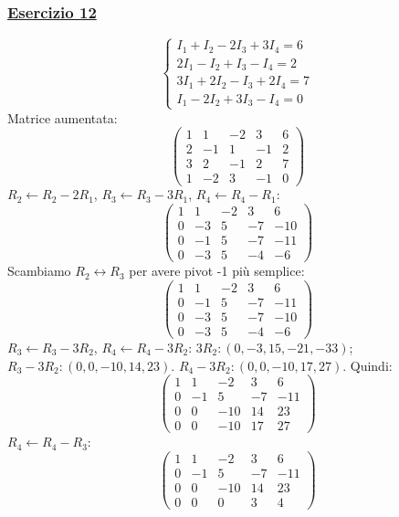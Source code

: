 \subsubsection*{\hyperref[ex:12]{Esercizio 12}}
\[
\begin{cases}
I_1 + I_2 - 2I_3 + 3I_4 = 6 \\
2I_1 - I_2 + I_3 - I_4 = 2 \\
3I_1 + 2I_2 - I_3 + 2I_4 = 7 \\
I_1 - 2I_2 + 3I_3 - I_4 = 0
\end{cases}
\]
Matrice aumentata:
\[
\left(\begin{array}{cccc|c}
1 & 1 & -2 & 3 & 6 \\
2 & -1 & 1 & -1 & 2 \\
3 & 2 & -1 & 2 & 7 \\
1 & -2 & 3 & -1 & 0
\end{array}\right)
\]
\(R_2 \leftarrow R_2 - 2R_1\), \(R_3 \leftarrow R_3 - 3R_1\), \(R_4 \leftarrow R_4 - R_1\):
\[
\left(\begin{array}{cccc|c}
1 & 1 & -2 & 3 & 6 \\
0 & -3 & 5 & -7 & -10 \\
0 & -1 & 5 & -7 & -11 \\
0 & -3 & 5 & -4 & -6
\end{array}\right)
\]
Scambiamo \(R_2 \leftrightarrow R_3\) per avere pivot -1 più semplice:
\[
\left(\begin{array}{cccc|c}
1 & 1 & -2 & 3 & 6 \\
0 & -1 & 5 & -7 & -11 \\
0 & -3 & 5 & -7 & -10 \\
0 & -3 & 5 & -4 & -6
\end{array}\right)
\]
\(R_3 \leftarrow R_3 - 3R_2\), \(R_4 \leftarrow R_4 - 3R_2\):
\(3R_2: (0,-3,15,-21,-33)\); \(R_3 - 3R_2: (0,0,-10,14,23)\).
\(R_4 - 3R_2: (0,0,-10,17,27)\).
Quindi:
\[
\left(\begin{array}{cccc|c}
1 & 1 & -2 & 3 & 6 \\
0 & -1 & 5 & -7 & -11 \\
0 & 0 & -10 & 14 & 23 \\
0 & 0 & -10 & 17 & 27
\end{array}\right)
\]
\(R_4 \leftarrow R_4 - R_3\):
\[
\left(\begin{array}{cccc|c}
1 & 1 & -2 & 3 & 6 \\
0 & -1 & 5 & -7 & -11 \\
0 & 0 & -10 & 14 & 23 \\
0 & 0 & 0 & 3 & 4
\end{array}\right)
\]

